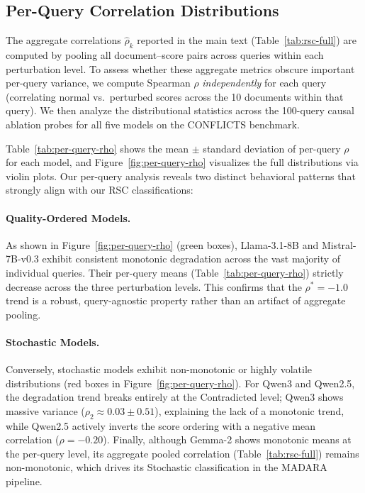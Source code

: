 \documentclass[11pt]{article}
\theoremstyle{definition}
\begin{document}
\subsection{Per-Query Correlation Distributions}
\label{sec:appendix-per-query-rho}

The aggregate correlations \(\hat{\rho}_k\) reported in the main text (Table~\ref{tab:rsc-full}) are computed by pooling all document--score pairs across queries within each perturbation level. To assess whether these aggregate metrics obscure important per-query variance, we compute Spearman \(\rho\) \emph{independently} for each query (correlating normal vs.\ perturbed scores across the 10 documents within that query). We then analyze the distributional statistics across the 100-query causal ablation probes for all five models on the CONFLICTS benchmark.

Table~\ref{tab:per-query-rho} shows the mean \(\pm\) standard deviation of per-query \(\rho\) for each model, and Figure~\ref{fig:per-query-rho} visualizes the full distributions via violin plots. Our per-query analysis reveals two distinct behavioral patterns that strongly align with our RSC classifications:

\paragraph{Quality-Ordered Models.} 
As shown in Figure~\ref{fig:per-query-rho} (green boxes), Llama-3.1-8B and Mistral-7B-v0.3 exhibit consistent monotonic degradation across the vast majority of individual queries. Their per-query means (Table~\ref{tab:per-query-rho}) strictly decrease across the three perturbation levels. This confirms that the \(\rho^* = -1.0\) trend is a robust, query-agnostic property rather than an artifact of aggregate pooling.

\paragraph{Stochastic Models.} 
Conversely, stochastic models exhibit non-monotonic or highly volatile distributions (red boxes in Figure~\ref{fig:per-query-rho}). For Qwen3 and Qwen2.5, the degradation trend breaks entirely at the Contradicted level; Qwen3 shows massive variance (\(\rho_2 \approx 0.03 \pm 0.51\)), explaining the lack of a monotonic trend, while Qwen2.5 actively inverts the score ordering with a negative mean correlation (\(\rho = -0.20\)). Finally, although Gemma-2 shows monotonic means at the per-query level, its aggregate pooled correlation (Table~\ref{tab:rsc-full}) remains non-monotonic, which drives its Stochastic classification in the MADARA pipeline.
\end{document}
